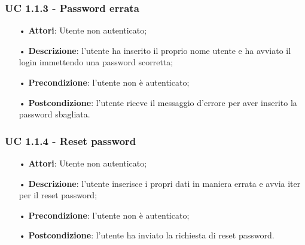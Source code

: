 \subsubsection{UC 1.1.3  - Password errata}
\begin{itemize}
\item[•]\textbf{Attori}: Utente non autenticato;
\item[•]\textbf{Descrizione}: l'utente ha inserito il proprio nome utente e ha avviato il login immettendo una password scorretta;
\item[•]\textbf{Precondizione}: l'utente non è autenticato;
\item[•]\textbf{Postcondizione}: l'utente riceve il messaggio d'errore per aver inserito la password sbagliata.
\end{itemize}

\subsubsection{UC 1.1.4 - Reset password}
\begin{itemize}
	\item[•]\textbf{Attori}: Utente non autenticato;
	\item[•]\textbf{Descrizione}: l’utente inserisce i propri dati in maniera errata e avvia iter per il reset password;
	\item[•]\textbf{Precondizione}: l’utente non è autenticato;
	\item[•]\textbf{Postcondizione}: l’utente ha inviato la richiesta di reset password.
\end{itemize}

